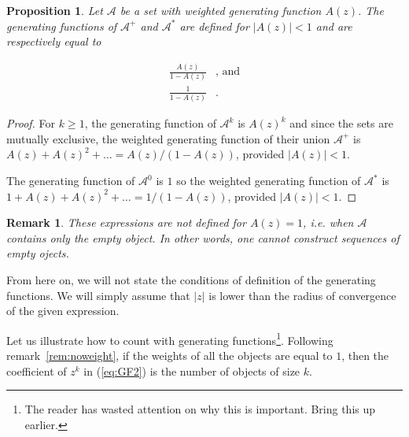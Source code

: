 \documentclass{article}
\newtheorem{proposition}{Proposition}
\newtheorem{remark}{Remark}
\begin{document}
\begin{proposition}
\label{th:sequences}
Let $\mathcal{A}$ be a set with weighted generating function $A(z)$. The
generating functions of $\mathcal{A}^+$ and $\mathcal{A}^*$ are defined
for $|A(z)| < 1$ and are respectively equal to

\begin{equation*}
\begin{split}
\frac{A(z)}{1-A(z)}&\text{, and} \\
\frac{1}{1-A(z)}&.
\end{split}
\end{equation*}
\end{proposition}

\begin{proof}
For $k \geq 1$, the generating function of $\mathcal{A}^k$ is $A(z)^k$ and
since the sets are mutually exclusive, the weighted generating function of
their union $\mathcal{A}^+$ is $A(z) + A(z)^2 + \ldots = A(z) / (1-A(z))$,
provided $|A(z)| < 1$.

The generating function of $\mathcal{A}^0$ is $1$ so the weighted
generating function of $\mathcal{A}^*$ is $1 + A(z) + A(z)^2 + \ldots =
1 / (1-A(z))$, provided $|A(z)| < 1$.
\end{proof}

\begin{remark}
These expressions are not defined for $A(z) = 1$, \textit{i.e.} when
$\mathcal{A}$ contains only the empty object. In other words, one cannot
construct sequences of empty ojects.
\end{remark}

From here on, we will not state the conditions of definition of the
generating functions. We will simply assume that $|z|$ is lower than the
radius of convergence of the given expression.

Let us illustrate how to count with generating functions\footnote{The
reader has wasted attention on why this is important. Bring this up
earlier.}. Following remark~\ref{rem:noweight}, if the weights of all the
objects are equal to $1$, then the coefficient of $z^k$ in (\ref{eq:GF2})
is the number of objects of size $k$.
\end{document}
